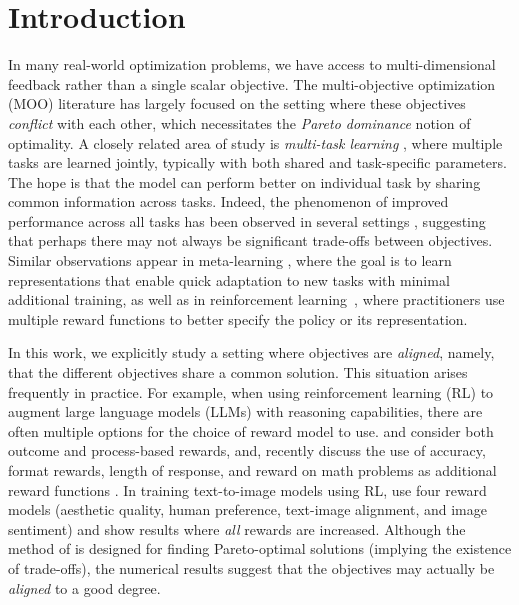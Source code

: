 \section{Introduction}
In many real-world optimization problems, we have access to multi-dimensional feedback rather than a single scalar objective. The multi-objective optimization (MOO) literature has largely focused on the setting where these objectives \emph{conflict} with each other, which necessitates the \emph{Pareto dominance} notion of optimality. A closely related area of study is \emph{multi-task learning} \citep{caruana1997multitask,teh2017distral,sener2018multi,yu2020gradient,lin2021reasonable,liu2021conflict,navon2022multi,lin2023libmtl,achituve2024bayesian,he2024robust}, where multiple tasks are learned jointly, typically with both shared and task-specific parameters. The hope is that the model can perform better on individual task by sharing common information across tasks. Indeed, the phenomenon of improved performance across all tasks has been observed in several settings \citep{lin2023libmtl,lee2024parrot}, suggesting that perhaps there may not always be significant trade-offs between objectives. Similar observations appear in meta-learning \citep{ravi2017optimization,finn2017model,hospedales2021meta}, where the goal is to learn representations that enable quick adaptation to new tasks with minimal additional training, as well as in reinforcement learning~\cite{jaderberg2016reinforcement,teh2017distral, veeriah2019discovery,dann2023reinforcement}, where practitioners use multiple reward functions to better specify the policy or its representation.

In this work, we explicitly study a setting where objectives are \emph{aligned}, namely, that the different objectives share a common solution. This situation arises frequently in practice. For example, when using reinforcement learning (RL) to augment large language models (LLMs) with reasoning capabilities, there are often multiple options for the choice of reward model to use. \citet{lightman2023let} and \citet{uesato2022solving} consider both outcome and process-based rewards, and, recently \citet{guo2025deepseek,team2025kimi} discuss the use of accuracy, format rewards, length of response, and reward on math problems as additional reward functions . In training text-to-image models using RL, \citet{lee2024parrot} use four reward models (aesthetic quality, human preference, text-image alignment, and image sentiment) and show results where \emph{all} rewards are increased. Although the method of \citet{lee2024parrot} is designed for finding Pareto-optimal solutions (implying the existence of trade-offs), the numerical results suggest that the objectives may actually be \emph{aligned} to a good degree. 

